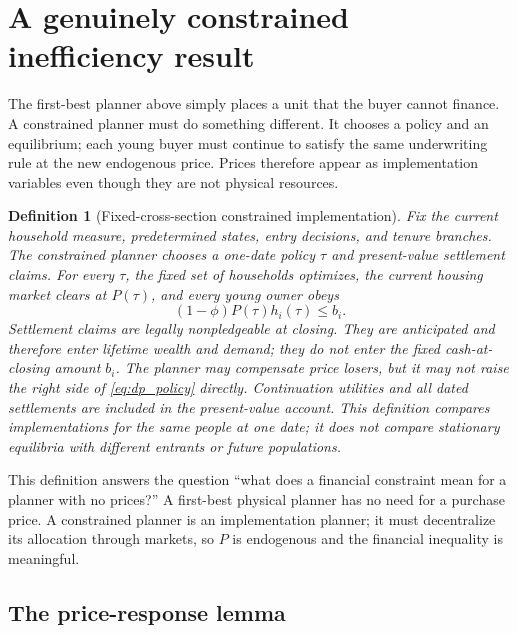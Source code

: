\documentclass[11pt]{article}
\newtheorem{definition}{Definition}
\newcommand{\1}{\mathbf 1}
\begin{document}
\section{A genuinely constrained inefficiency result}
\label{sec:constrained}

The first-best planner above simply places a unit that the buyer cannot finance.
A constrained planner must do something different. It chooses a policy and an
equilibrium; each young buyer must continue to satisfy the same underwriting
rule at the new endogenous price. Prices therefore appear as implementation
variables even though they are not physical resources.

\begin{definition}[Fixed-cross-section constrained implementation]
\label{def:constrained}
Fix the current household measure, predetermined states, entry decisions, and
tenure branches. The constrained planner chooses a one-date policy $\tau$ and
present-value settlement claims. For every $\tau$, the fixed set of households
optimizes, the current housing market clears at $P(\tau)$, and every young
owner obeys
\begin{equation}
(1-\phi)P(\tau)h_i(\tau)\le b_i.
\label{eq:dp_policy}
\end{equation}
Settlement claims are legally nonpledgeable at closing. They are anticipated
and therefore enter lifetime wealth and demand; they do not enter the fixed
cash-at-closing amount $b_i$. The planner may compensate price losers, but it
may not raise the right side of \eqref{eq:dp_policy} directly. Continuation
utilities and all dated settlements are included in the present-value account.
This definition compares implementations for the same people at one date; it
does not compare stationary equilibria with different entrants or future
populations.
\end{definition}

This definition answers the question ``what does a financial constraint mean
for a planner with no prices?'' A first-best physical planner has no need for a
purchase price. A constrained planner is an implementation planner; it must
decentralize its allocation through markets, so $P$ is endogenous and the
financial inequality is meaningful.

\subsection{The price-response lemma}
\end{document}
